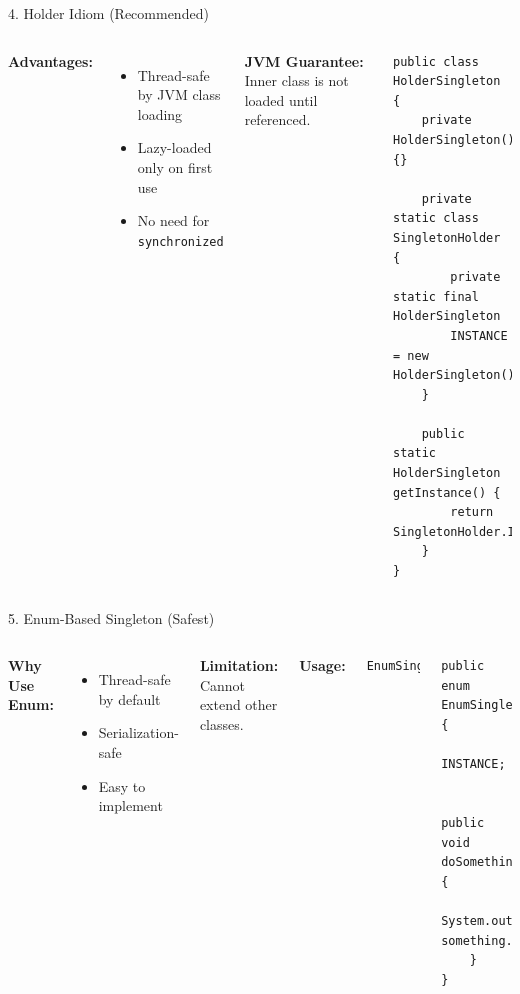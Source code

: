 \documentclass[aspectratio=169, table]{beamer}
\begin{document}
\begin{frame}[fragile]{4. Holder Idiom (Recommended)}
\vspace{5pt}
\begin{columns}[T]
\textbf{Advantages:}
\begin{itemize}
\item Thread-safe by JVM class loading
\item Lazy-loaded only on first use
\item No need for \texttt{synchronized}
\end{itemize}

\textbf{JVM Guarantee:}
Inner class is not loaded until referenced.

\begin{lstlisting}[style=JavaStyle]
public class HolderSingleton {
	private HolderSingleton() {}
	
	private static class SingletonHolder {
		private static final HolderSingleton 
		INSTANCE = new HolderSingleton();
	}
	
	public static HolderSingleton getInstance() {
		return SingletonHolder.INSTANCE;
	}
}
\end{lstlisting}
\end{columns}
\end{frame}

\begin{frame}[fragile]{5. Enum-Based Singleton (Safest)}
\vspace{5pt}
\begin{columns}[T]
\textbf{Why Use Enum:}
\begin{itemize}
\item Thread-safe by default
\item Serialization-safe
\item Easy to implement
\end{itemize}

\textbf{Limitation:}
Cannot extend other classes.

\textbf{Usage:}
\begin{lstlisting}[style=JavaStyle]
EnumSingleton.INSTANCE.doSomething();
\end{lstlisting}

\begin{lstlisting}[style=JavaStyle]
public enum EnumSingleton {
	INSTANCE;
	
	public void doSomething() {
		System.out.println("Doing something...");
	}
}
\end{lstlisting}
\end{columns}
\end{frame}
\end{document}
